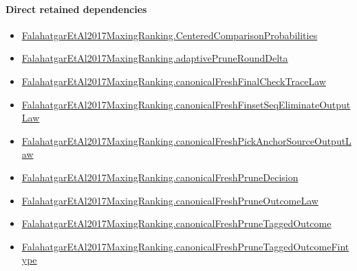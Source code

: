 \documentclass[10pt]{article}
\begin{document}
\paragraph{Direct retained dependencies}
\begin{itemize}\raggedright
\item \hyperlink{paper-prerequisite-b99b697ef57f53ce}{Falahatgar\allowbreak{}Et\allowbreak{}Al2017\allowbreak{}Maxing\allowbreak{}Ranking.\allowbreak{}Centered\allowbreak{}Comparison\allowbreak{}Probabilities}
\item \hyperlink{governing-declaration-0a2d9c4ad2e46f08}{Falahatgar\allowbreak{}Et\allowbreak{}Al2017\allowbreak{}Maxing\allowbreak{}Ranking.\allowbreak{}adaptive\allowbreak{}Prune\allowbreak{}Round\allowbreak{}Delta}
\item \hyperlink{governing-declaration-7158096c1e83f8c8}{Falahatgar\allowbreak{}Et\allowbreak{}Al2017\allowbreak{}Maxing\allowbreak{}Ranking.\allowbreak{}canonical\allowbreak{}Fresh\allowbreak{}Final\allowbreak{}Check\allowbreak{}Trace\allowbreak{}Law}
\item \hyperlink{governing-declaration-80739295f55f6395}{Falahatgar\allowbreak{}Et\allowbreak{}Al2017\allowbreak{}Maxing\allowbreak{}Ranking.\allowbreak{}canonical\allowbreak{}Fresh\allowbreak{}Finset\allowbreak{}Seq\allowbreak{}Eliminate\allowbreak{}Output\allowbreak{}Law}
\item \hyperlink{governing-declaration-c9504cf8a39d2ae0}{Falahatgar\allowbreak{}Et\allowbreak{}Al2017\allowbreak{}Maxing\allowbreak{}Ranking.\allowbreak{}canonical\allowbreak{}Fresh\allowbreak{}Pick\allowbreak{}Anchor\allowbreak{}Source\allowbreak{}Output\allowbreak{}Law}
\item \hyperlink{governing-declaration-5f4aa5a2143dcc9f}{Falahatgar\allowbreak{}Et\allowbreak{}Al2017\allowbreak{}Maxing\allowbreak{}Ranking.\allowbreak{}canonical\allowbreak{}Fresh\allowbreak{}Prune\allowbreak{}Decision}
\item \hyperlink{governing-declaration-2d276a1a3b14a7e3}{Falahatgar\allowbreak{}Et\allowbreak{}Al2017\allowbreak{}Maxing\allowbreak{}Ranking.\allowbreak{}canonical\allowbreak{}Fresh\allowbreak{}Prune\allowbreak{}Outcome\allowbreak{}Law}
\item \hyperlink{governing-declaration-3a0933a8178fc16e}{Falahatgar\allowbreak{}Et\allowbreak{}Al2017\allowbreak{}Maxing\allowbreak{}Ranking.\allowbreak{}canonical\allowbreak{}Fresh\allowbreak{}Prune\allowbreak{}Tagged\allowbreak{}Outcome}
\item \hyperlink{governing-declaration-6e0ce93b44515012}{Falahatgar\allowbreak{}Et\allowbreak{}Al2017\allowbreak{}Maxing\allowbreak{}Ranking.\allowbreak{}canonical\allowbreak{}Fresh\allowbreak{}Prune\allowbreak{}Tagged\allowbreak{}Outcome\allowbreak{}Fintype}

\end{itemize}
\end{document}
